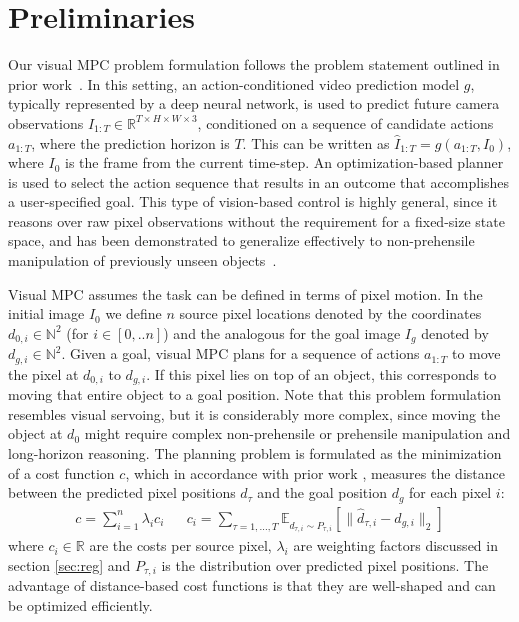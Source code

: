 \vspace{-0.1cm}
\section{Preliminaries}
\label{sec:prelim}
\vspace{-0.2cm}

Our visual MPC problem formulation follows the problem statement outlined in prior work~\cite{foresight}. In this setting, an action-conditioned video prediction model $g$, typically represented by a deep neural network, is used to predict future camera observations $\hat{I}_{1:T} \in \mathbb{R}^{T \times H\times W \times 3}$, conditioned on a sequence of candidate actions $a_{1:T}$, where the prediction horizon is $T$. This can be written as $\hat{I}_{1:T} = g(a_{1:T}, I_0)$, where $I_0$ is the frame from the current time-step. An optimization-based planner is  used to select the action sequence that results in an outcome that accomplishes a user-specified goal. This type of vision-based control is highly general, since it reasons over raw pixel observations without the requirement for a fixed-size state space, and has been demonstrated to generalize effectively to non-prehensile manipulation of previously unseen objects~\cite{foresight,sna}.

Visual MPC assumes the task can be defined in terms of pixel motion. In the initial image $I_0$ we define $n$ source pixel locations denoted by the coordinates $d_{0,i} \in \mathbb{N}^2$ (for $i \in [0,..n]$) and the analogous for the goal image $I_g$ denoted by $d_{g,i} \in \mathbb{N}^2$. Given a goal, visual MPC plans for a sequence of actions $a_{1:T}$
to move the pixel at $d_{0,i}$ to $d_{g,i}$. If this pixel lies on top of an object, this corresponds to moving that entire object to a goal position. Note that this problem formulation resembles visual servoing, but it is considerably more complex, since moving the object at $d_0$ might require complex non-prehensile or prehensile manipulation and long-horizon reasoning.
The planning problem is formulated as the minimization of a cost function $c$, which in accordance with prior work \cite{sna}, measures the distance between the predicted pixel positions $\hat{d}_{\tau}$ and the goal position $d_g$ for each pixel $i$:
\begin{align}
c = \sum^n_{i = 1}  \lambda_i c_i && c_i = \sum_{\tau = 1, \dots, T} \mathbb{E}_{\hat{d}_{\tau,i} \sim P_{\tau,i}} \left[\|\hat{d}_{\tau,i} - d_{g,i}\|_2\right]  
\label{eq:cost}
\end{align}
where $c_i\in \mathbb{R}$ are the costs per source pixel, $\lambda_i$ are weighting factors discussed in section \ref{sec:reg} and $P_{\tau,i}$ is the distribution over predicted pixel positions. The advantage of distance-based cost functions is that they are well-shaped and can be optimized efficiently. 


